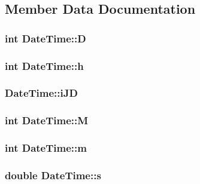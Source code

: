 \subsection{Member Data Documentation}
\hypertarget{struct_date_time_a979ec52428a05d2f2ed827345a416fa6}{
\subsubsection[{D}]{\setlength{\rightskip}{0pt plus 5cm}int Date\-Time\-::\-D}}\label{struct_date_time_a979ec52428a05d2f2ed827345a416fa6}
\hypertarget{struct_date_time_a2146547149b65f64e07e1ac6ed8654b6}{
\subsubsection[{h}]{\setlength{\rightskip}{0pt plus 5cm}int Date\-Time\-::h}}\label{struct_date_time_a2146547149b65f64e07e1ac6ed8654b6}
\hypertarget{struct_date_time_ae5043d34fa3c3c4dc1121fec886c6f10}{
\subsubsection[{i\-J\-D}]{ Date\-Time\-::i\-J\-D}}\label{struct_date_time_ae5043d34fa3c3c4dc1121fec886c6f10}
\hypertarget{struct_date_time_a00e6515603bb5d7c5ce79d3a5a6438a7}{
\subsubsection[{M}]{\setlength{\rightskip}{0pt plus 5cm}int Date\-Time\-::\-M}}\label{struct_date_time_a00e6515603bb5d7c5ce79d3a5a6438a7}
\hypertarget{struct_date_time_ac5db527c48331a515bea3b828d1a2254}{
\subsubsection[{m}]{\setlength{\rightskip}{0pt plus 5cm}int Date\-Time\-::m}}\label{struct_date_time_ac5db527c48331a515bea3b828d1a2254}
\hypertarget{struct_date_time_a69a803afb69b74206418bda0bc1bcaa2}{
\subsubsection[{s}]{\setlength{\rightskip}{0pt plus 5cm}double Date\-Time\-::s}}\label{struct_date_time_a69a803afb69b74206418bda0bc1bcaa2}
